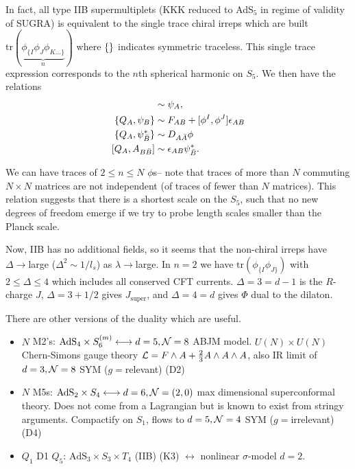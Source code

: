 In fact, all type IIB supermultiplets (KKK reduced to AdS${}_5$ in regime of validity of SUGRA) is equivalent to the single trace chiral irreps which are built $\text{tr}(\underbrace{\phi_{\{I}\phi_J \phi_{K\ldots\}}}_{n})$ where $\{\}$ indicates symmetric traceless. This single trace expression corresponds to the $n$th spherical harmonic on $S_5$. We then have the relations
\begin{align*}
    [Q_A,\phi]&\sim \psi_A,\\
    \set{Q_A,\psi_B} &\sim F_{AB} + [\phi^I,\phi^J]\epsilon_{AB}\\
    \set{Q_A,\psi_{\bar B}^*} & \sim D_{A\bar A} \phi\\
    [Q_A,A_{B\bar B}]&\sim \epsilon_{AB}\psi_{\bar B}^*.
\end{align*}

We can have traces of $2\leq n \leq N$ $\phi$s-- note that traces of more than $N$ commuting $N\times N$ matrices are not independent (of traces of fewer than $N$ matrices). This relation suggests that there is a shortest scale on the $S_5$, such that no new degrees of freedom emerge if we try to probe length scales smaller than the Planck scale.

Now, IIB has no additional fields, so it seems that the non-chiral irreps have $\Delta \to$large ($\Delta^2 \sim 1/l_s$) as $\lambda\to$large. In $n=2$ we have $\text{tr}(\phi_{\{I}\phi_{J\}})$ with $2\leq \Delta \leq 4$ which includes all conserved CFT currents. $\Delta=3=d-1$ is the $R$-charge $J$, $\Delta=3+1/2$ gives $J_\text{super}$, and $\Delta=4=d$ gives $\Phi$ dual to the dilaton. %

There are other versions of the duality which are useful.
\begin{itemize}
    \item $N$ M2's: $\text{AdS}_4\times S_6^{(m)}\longleftrightarrow d=5, \mathcal N=8$ ABJM model. $U(N)\times U(N)$ Chern-Simons gauge theory $\mathcal L= F\wedge A +\frac{2}{3} A \wedge A \wedge A$, also IR limit of $d=3, \mathcal N = 8$ SYM ($g=$relevant) (D2)
    \item $N$ M5s: $\text{AdS}_2 \times S_4 \longleftrightarrow d=6, \mathcal N=(2,0)$ max dimensional superconformal theory. Does not come from a Lagrangian but is known to exist from stringy arguments. Compactify on $S_1$, flows to $d=5,\mathcal N=4$ SYM ($g=$irrelevant) (D4)
    \item $Q_1$ D1 $Q_5$: $\text{AdS}_3 \times S_3 \times T_4$ (IIB) (K3) $\longleftrightarrow$ nonlinear $\sigma$-model $d=2$.
\end{itemize}